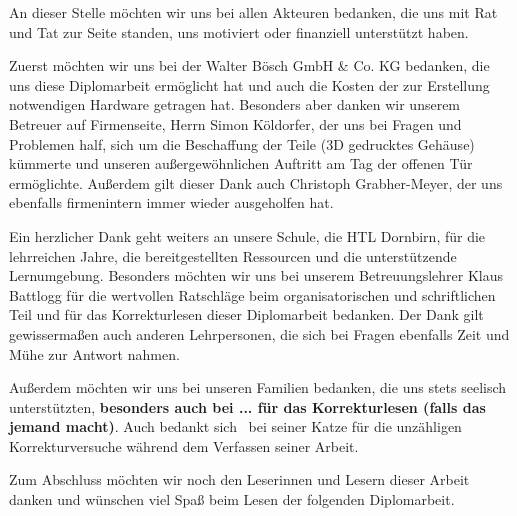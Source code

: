 \noindent An dieser Stelle möchten wir uns bei allen Akteuren bedanken, die uns mit Rat und Tat zur Seite standen, uns motiviert oder finanziell unterstützt haben.

Zuerst möchten wir uns bei der Walter Bösch GmbH \& Co. KG bedanken, die uns diese Diplomarbeit ermöglicht hat und auch die Kosten der zur Erstellung notwendigen Hardware getragen hat. Besonders aber danken wir unserem Betreuer auf Firmenseite, Herrn Simon Köldorfer, der uns bei Fragen und Problemen half, sich um die Beschaffung der Teile (\zB 3D gedrucktes Gehäuse) kümmerte und unseren außergewöhnlichen Auftritt am Tag der offenen Tür ermöglichte. Außerdem gilt dieser Dank auch Christoph Grabher-Meyer, der uns ebenfalls firmenintern immer wieder ausgeholfen hat.

Ein herzlicher Dank geht weiters an unsere Schule, die HTL Dornbirn, für die lehrreichen Jahre, die bereitgestellten Ressourcen und die unterstützende Lernumgebung. Besonders möchten wir uns bei unserem Betreuungslehrer Klaus Battlogg für die wertvollen Ratschläge beim organisatorischen und schriftlichen Teil und für das Korrekturlesen dieser Diplomarbeit bedanken. Der Dank gilt gewissermaßen auch anderen Lehrpersonen, die sich bei Fragen ebenfalls Zeit und Mühe zur Antwort nahmen.

Außerdem möchten wir uns bei unseren Familien bedanken, die uns stets seelisch unterstützten, \textbf{besonders auch bei ... für das Korrekturlesen (falls das jemand macht)}.
Auch bedankt sich \pezze\ bei seiner Katze für die unzähligen Korrekturversuche während dem Verfassen seiner Arbeit.

Zum Abschluss möchten wir noch den Leserinnen und Lesern dieser Arbeit danken und wünschen viel Spaß beim Lesen der folgenden Diplomarbeit.